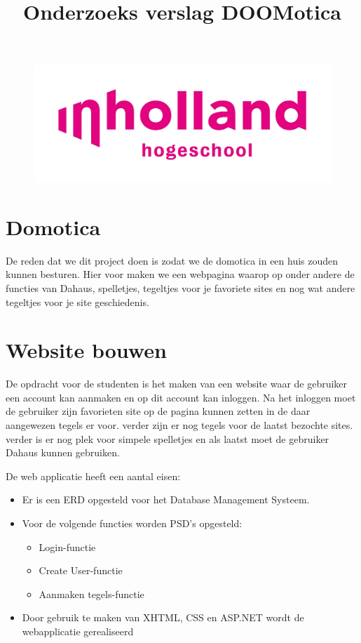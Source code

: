 \documentclass[11pt]{article}
\title{Onderzoeks verslag DOOMotica}
\begin{document}
	\maketitle %
	\begin{figure}[h]
		\centering
		\includegraphics[width=\textwidth]{inholland}
	\end{figure}
	
	\newpage
	
	\tableofcontents
	\newpage
	\section{Domotica}
	De reden dat we dit project doen is zodat we de domotica in een huis zouden kunnen besturen. Hier voor maken we een webpagina waarop op onder andere de functies van Dahaus, spelletjes, tegeltjes voor je favoriete sites en nog wat andere tegeltjes voor je site geschiedenis.
	\newline
	\newline
	\newline
	\newline
	\section{Website bouwen}
	
	De opdracht voor de studenten is het maken van een website waar de gebruiker een account kan aanmaken en op dit account kan inloggen. Na het inloggen moet de gebruiker zijn favorieten site op de pagina kunnen zetten in de daar aangewezen tegels er voor. verder zijn er nog tegels voor de laatst bezochte sites. verder is er nog plek voor simpele spelletjes en als laatst moet de gebruiker Dahaus kunnen gebruiken.
	
	De web applicatie heeft een aantal eisen:
	\begin{itemize}
		\item Er is een ERD opgesteld voor het Database Management Systeem.
		\item Voor de volgende functies worden PSD's opgesteld:
		\begin{itemize}
			\item Login-functie
			\item Create User-functie
			\item Aanmaken tegels-functie
		\end{itemize}
		\item Door gebruik te maken van XHTML, CSS en ASP.NET wordt de webapplicatie gerealiseerd
	\end{itemize}
	
\end{document}
